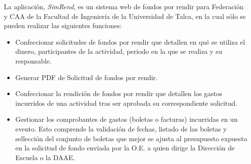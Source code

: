La aplicación, \emph{SimRend}, es un sistema web de fondos por rendir para Federación y CAA de la Facultad de Ingeniería de la Universidad de Talca, en la cual sólo se pueden realizar las siguientes funciones:

\begin{itemize}
    \item Confeccionar solicitudes de fondos por rendir que detallen en qué se utiliza el dinero, participantes de la actividad, periodo en la que se realiza y su responsable.
    
    \item Generar PDF de Solicitud de fondos por rendir.

    \item Confeccionar la rendición de fondos por rendir que detallen los gastos incurridos de una actividad tras ser aprobada su correspondiente solicitud.
    
    \item Gestionar los comprobantes de gastos (boletas o facturas) incurridas en un evento. Esto comprende la validación de fechas, listado de las boletas y sellección del conjunto de boletas que mejor se ajusta al presupuesto expuesto en la solicitud de fondo enviada por la O.E. a quien dirige la Dirección de Escuela o la DAAE.
    
\end{itemize}